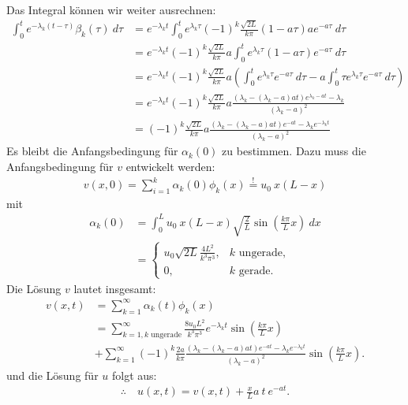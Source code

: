 \documentclass[12pt]{article}
\begin{document}
Das Integral können wir weiter ausrechnen:
\begin{align*}
	\int_0^t e^{-\lambda_k(t-\tau)} \beta_k(\tau) \ d\tau
	 & = e^{-\lambda_k t} \int_0^t e^{\lambda_k \tau} (-1)^k \frac{\sqrt{2 L}}{k \pi} (1- a \tau) a e^{-a \tau} \ d\tau                           \\
	 & = e^{-\lambda_k t}(-1)^k \frac{\sqrt{2L}}{k \pi} a \int_0^t e^{\lambda_k \tau} ( 1 - a \tau) e^{-a \tau} \ d\tau                           \\
	 & = e^{-\lambda_k t}(-1)^k \frac{\sqrt{2L}}{k \pi} a \left( \int_0^t e^{\lambda_k \tau} e^{-a \tau} \ d\tau
	- a \int_0^t \tau e^{\lambda_k \tau} e^{-a \tau} \ d\tau \right)                                                                              \\
	 & = e^{-\lambda_k t}(-1)^k \frac{\sqrt{2L}}{k \pi} a  \frac{(\lambda_k - (\lambda_k-a)a t)e^{\lambda_k -a t} - \lambda_k}{(\lambda_k - a)^2} \\
	 & = (-1)^k \frac{\sqrt{2L}}{k \pi} a  \frac{(\lambda_k - (\lambda_k-a)a t)e^{-a t} - \lambda_k e^{-\lambda_k t}}{(\lambda_k - a)^2}
\end{align*}
Es bleibt die Anfangsbedingung für $\alpha_k(0)$ zu bestimmen.
Dazu muss die Anfangsbedingung für $v$ entwickelt werden:
\begin{align*}
	v(x,0) = \sum_{i=1}^k \alpha_k(0) \phi_k(x) \overset{!}{=} u_0\ x(L-x)
\end{align*}
mit
\begin{align*}
	\alpha_k(0)
	 & = \int_0^L u_0\ x (L-x) \sqrt{\frac{2}{L}} \sin\left( \frac{k \pi}{L} x \right) \ dx \\
	 & =
	\begin{cases}
		\displaystyle
		u_0 \sqrt{2L} \frac{4 L^2}{k^3 \pi^3}, & k \text{ ungerade}, \\
		0,                                     & k\text{ gerade}.
	\end{cases}
\end{align*}
Die Lösung $v$ lautet insgesamt:
\begin{align*}
	v(x,t) & = \sum_{k=1}^\infty \alpha_k(t) \phi_k(x)                                                                                                                                         \\
	       & = \sum_{k=1,k \text{ ungerade}}^\infty \frac{8 u_0 L^2}{k^3 \pi^3} e^{-\lambda_k t} \sin\left( \frac{k \pi}{L} x \right)                                                          \\
	       & + \sum_{k=1}^\infty (-1)^k \frac{2a}{k \pi}   \frac{(\lambda_k - (\lambda_k-a)a t)e^{-a t} - \lambda_k e^{-\lambda_k t}}{(\lambda_k - a)^2} \sin\left( \frac{k \pi}{L} x \right).
\end{align*}
und die Lösung für $u$ folgt aus:
\begin{align*}
	\therefore\quad\boxed{
		u(x,t) = v(x,t) + \frac{x}{L} a\ t\ e^{-a t}.
	}
\end{align*}
\end{document}

